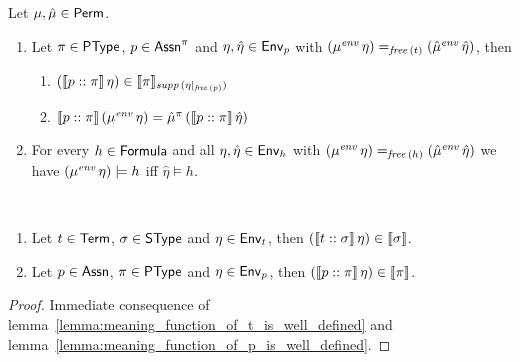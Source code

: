 \documentclass[12pt,a4paper]{report}
\newcommand{\senv}{\nstyle{env}}
\begin{document}
\begin{lemma} \label{lemma:meaning_function_of_p_is_well_defined}
  Let $\mu,\hat{\mu}\in\mathsf{Perm}$.
  \begin{enumerate}
    \item Let $\pi \in \mathsf{PType}$, $p \in \mathsf{Assn}^\pi$ and $\eta,\hat{\eta} \in \mathsf{Env}_p$ with
          $(\mu^\senv\,\eta) =_{\free{t}} (\hat{\mu}^\senv\,\hat{\eta})$, then
          \begin{enumerate}
            \item $(\llbracket p\mathrel{::}\pi\rrbracket\,\eta) \in \llbracket\pi\rrbracket_{\mathit{supp}\,(\eta|_{\mathit{free}\,(p)})}$
            \item $\semantic{\tj{p}{\pi}}\,(\mu^\senv\,\eta) = \hat{\mu}^\pi\,(\semantic{\tj{p}{\pi}}\,\hat{\eta})$
          \end{enumerate}

    \item For every $h \in \mathsf{Formula}$ and all $\eta,\hat{\eta}\in\mathsf{Env}_h$ with 
          $(\mu^\senv\,\eta) =_{\free{h}} (\hat{\mu}^\senv\,\hat{\eta})$ we have
          $(\mu^\senv\,\eta)\models h$ iff $\hat{\eta}\models h$.
  \end{enumerate}
\end{lemma}

\begin{theorem} \
  \begin{enumerate}
    \item Let $t \in\mathsf{Term}$, $\sigma\in\mathsf{SType}$ and $\eta\in\mathsf{Env}_t$, then
          $(\llbracket t\mathrel{::}\sigma\rrbracket\,\eta) \in \llbracket\sigma\rrbracket$.
    \item Let $p \in\mathsf{Assn}$, $\pi\in\mathsf{PType}$ and $\eta\in\mathsf{Env}_p$, then
          $(\llbracket p\mathrel{::}\pi\rrbracket\,\eta) \in \llbracket\pi\rrbracket$.
  \end{enumerate}
\end{theorem}

\begin{proof}
  Immediate consequence of lemma~\ref{lemma:meaning_function_of_t_is_well_defined}
  and lemma~\ref{lemma:meaning_function_of_p_is_well_defined}.
\end{proof}
\end{document}
